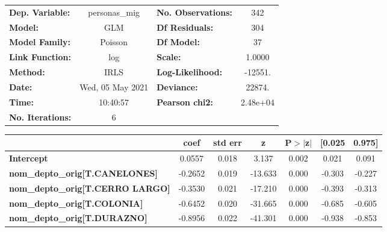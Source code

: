\begin{center}
\begin{tabular}{lclc}
\toprule
\textbf{Dep. Variable:}                     &  personas\_mig   & \textbf{  No. Observations:  } &      342    \\
\textbf{Model:}                             &       GLM        & \textbf{  Df Residuals:      } &      304    \\
\textbf{Model Family:}                      &     Poisson      & \textbf{  Df Model:          } &       37    \\
\textbf{Link Function:}                     &       log        & \textbf{  Scale:             } &    1.0000   \\
\textbf{Method:}                            &       IRLS       & \textbf{  Log-Likelihood:    } &   -12551.   \\
\textbf{Date:}                              & Wed, 05 May 2021 & \textbf{  Deviance:          } &    22874.   \\
\textbf{Time:}                              &     10:40:57     & \textbf{  Pearson chi2:      } &  2.48e+04   \\
\textbf{No. Iterations:}                    &        6         & \textbf{                     } &             \\
\bottomrule
\end{tabular}
\begin{tabular}{lcccccc}
                                            & \textbf{coef} & \textbf{std err} & \textbf{z} & \textbf{P$> |$z$|$} & \textbf{[0.025} & \textbf{0.975]}  \\
\midrule
\textbf{Intercept}                          &       0.0557  &        0.018     &     3.137  &         0.002        &        0.021    &        0.091     \\
\textbf{nom\_depto\_orig[T.CANELONES]}      &      -0.2652  &        0.019     &   -13.633  &         0.000        &       -0.303    &       -0.227     \\
\textbf{nom\_depto\_orig[T.CERRO LARGO]}    &      -0.3530  &        0.021     &   -17.210  &         0.000        &       -0.393    &       -0.313     \\
\textbf{nom\_depto\_orig[T.COLONIA]}        &      -0.6452  &        0.020     &   -31.665  &         0.000        &       -0.685    &       -0.605     \\
\textbf{nom\_depto\_orig[T.DURAZNO]}        &      -0.8956  &        0.022     &   -41.301  &         0.000        &       -0.938    &       -0.853     \\

\end{tabular}
\end{center}

